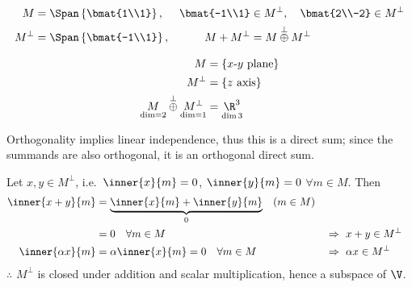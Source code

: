 \begin{center}
\begin{minipage}{0.34\textwidth}\centering
{}
\end{minipage}%
\begin{minipage}{0.6\textwidth}
\begin{align*}
M&=\Span\left\{\bmat{1\\1}\right\}, & \bmat{-1\\1}&\in M^\perp, \quad \bmat{2\\-2}\in M^\perp\\
M^\perp&=\Span\left\{\bmat{-1\\1}\right\}, & M+M^\perp&=M\overset{\perp}{\oplus}M^\perp
\end{align*}
\end{minipage}
\end{center}
\begin{center}
\begin{minipage}{0.3\textwidth}\centering
{}
\end{minipage}%
\begin{minipage}{0.55\textwidth}
\begin{align*}
M&=\{x\text{-}y \text{ plane}\}\\
M^\perp&=\{z \text{ axis}\}\\
\underset{\dim=2}{M}\overset{\perp}{\oplus}\underset{\dim=1}{M^\perp}&=\underset{\dim 3}{\R^3}
\end{align*}
\end{minipage}
\end{center}
Orthogonality implies linear independence, thus this is a direct sum; since the summands are also orthogonal, it is an orthogonal direct sum.

\begin{claim}
\end{claim}
Let $x,y\in M^\perp$, i.e.\ $\inner{x}{m}=0$, $\inner{y}{m}=0$ $\forall m\in M$. Then
\begin{align*}
\inner{x+y}{m}&=\underbrace{\inner{x}{m}+\inner{y}{m}}_{0} \quad (m\in M)\\
&=0 \quad \forall m\in M &&\Rightarrow\ x+y\in M^\perp\\
\inner{\alpha x}{m}&=\alpha\inner{x}{m}=0 \quad\forall m\in M &&\Rightarrow\ \alpha x\in M^\perp
\end{align*}
$\therefore$ $M^\perp$ is closed under addition and scalar multiplication, hence a subspace of $\V$.

